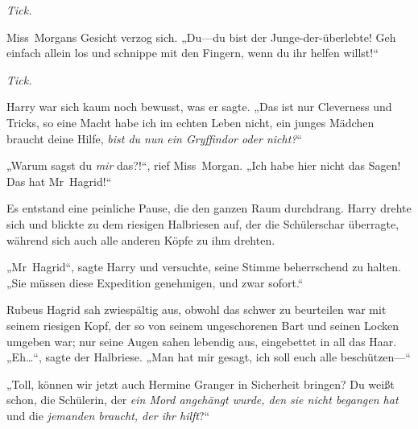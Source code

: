 \emph{Tick.}

Miss~Morgans Gesicht verzog sich.
„Du—du bist der Junge-der-überlebte! Geh einfach allein los und schnippe mit den Fingern, wenn du ihr helfen willst!“

\emph{Tick.}

Harry war sich kaum noch bewusst, was er sagte.
„Das ist nur Cleverness und Tricks, so eine Macht habe ich im echten Leben nicht, ein junges Mädchen braucht deine Hilfe, \emph{bist du nun ein Gryffindor oder nicht?}“

„Warum sagst du \emph{mir} das?!“, rief Miss~Morgan.
„Ich habe hier nicht das Sagen! Das hat Mr~Hagrid!“


Es entstand eine peinliche Pause, die den ganzen Raum durchdrang. Harry drehte sich und blickte zu dem riesigen Halbriesen auf, der die Schülerschar überragte, während sich auch alle anderen Köpfe zu ihm drehten.

„Mr~Hagrid“, sagte Harry und versuchte, seine Stimme beherrschend zu halten.
„Sie müssen diese Expedition genehmigen, und zwar sofort.“

Rubeus Hagrid sah zwiespältig aus, obwohl das schwer zu beurteilen war mit seinem riesigen Kopf, der so von seinem ungeschorenen Bart und seinen Locken umgeben war; nur seine Augen sahen lebendig aus, eingebettet in all das Haar.
„Eh…“, sagte der Halbriese.
„Man hat mir gesagt, ich soll euch alle beschützen—“

„Toll, können wir jetzt auch Hermine Granger in Sicherheit bringen? Du weißt schon, die Schülerin, der \emph{ein Mord angehängt wurde, den sie nicht begangen hat} und die \emph{jemanden braucht, der ihr hilft}?“

